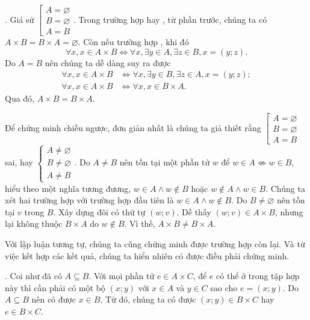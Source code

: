 . Giả sử $\left[\begin{array}{l}
   A = \varnothing \\ B = \varnothing \\ 
   A = B
\end{array}\right.$. Trong trường hợp  hay , từ phần trước, chúng ta có $A \times B = B \times A = \varnothing$. Còn nếu trường hợp , khi đó
\begin{equation*}
   \forall x, x \in A \times B \iff \forall x, \exists y \in A, \exists z \in B, x = (y; z).
\end{equation*}
Do $A = B$ nên chúng ta dễ dàng suy ra được
\begin{align*}
   \forall x, x \in A \times B &\iff \forall x, \exists y \in B, \exists z \in A, x = (y; z); \\
   \forall x, x \in A \times B &\iff \forall x, x\in B \times A.
\end{align*}
Qua đó, $A \times B = B \times A$.

Để chứng minh chiều ngược, đơn giản nhất là chúng ta giả thiết rằng $\left[\begin{array}{l}
   A = \varnothing \\ B = \varnothing \\ 
   A = B
\end{array}\right.$ sai, hay $\begin{cases}
   A \neq \varnothing \\
   B \neq \varnothing \\
   A \neq B
\end{cases}$. Do $A \neq B$ nên tồn tại một phần tử $w$ để $w \in A \nLeftrightarrow w \in B$, hiểu theo một nghĩa tương đương, $w \in A \land w \notin B$ hoặc $w \notin A \land w \in B$. Chúng ta xét hai trường hợp với trường hợp đầu tiên là $w \in A \land w \notin B$. Do $B \neq \varnothing$ nên tồn tại $v$ trong $B$. Xây dựng đôi có thứ tự $(w; v)$. Dễ thấy $(w; v) \in A \times B$, nhưng lại không thuộc $B \times A$ do $w \notin B$. Vì thế, $A \times B \neq B \times A$.

Với lập luận tương tự, chúng ta cũng chứng minh được trường hợp còn lại. Và từ việc kết hợp các kết quả, chúng ta hiển nhiên có được điều phải chứng minh.

. Coi như đã có $A \subseteq B$. Với mọi phần tử $e \in A \times C$, để $e$ có thể ở trong tập hợp này thì cần phải có một bộ $(x; y)$ với $x \in A$ và $y \in C$ sao cho $e = (x; y)$. Do $A \subseteq B$ nên có được $x \in B$. Từ đó, chúng ta có được $(x; y) \in B \times C$ hay $e \in B\times C$.

